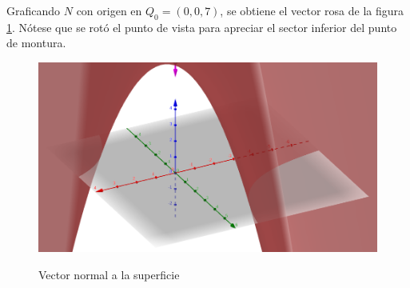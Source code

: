 \documentclass{article}
\begin{document}
Graficando $N$ con origen en $Q_0 = (0,0,7)$, se obtiene el vector rosa de la figura \ref{fig:1-d-5}. Nótese que se rotó el punto de vista para apreciar el sector inferior del punto de montura.

\begin{figure}[ht]
\caption{Vector normal a la superficie}
\includegraphics[scale=0.25]{img/ejercicios/3/1-d-5.png} 
\centering
\label{fig:1-d-5}
\end{figure}
\end{document}

